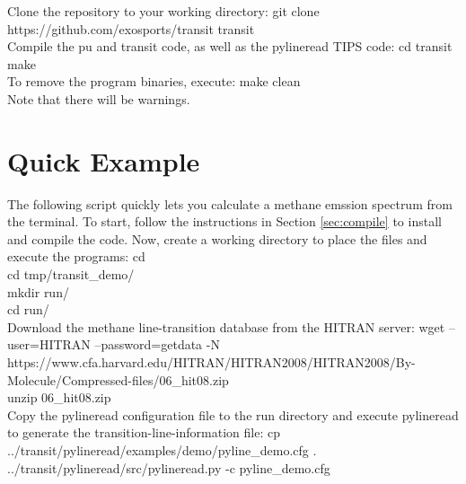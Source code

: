 \documentclass[letterpaper, 12pt]{article}
\begin{document}
\noindent Clone the repository to your working directory: \newline
{\tttb git clone https://github.com/exosports/transit transit} \\

\noindent Compile the {\tttm pu} and {\tttm transit} code, as well as
the {\tttm pylineread} TIPS code: \newline
{\tttb cd transit} \\
{\tttb make} \\

\noindent To remove the program binaries, execute: \newline
{\tttb make clean} \\

\noindent Note that there will be warnings.

\newpage

\section{Quick Example}
\label{sec:quick-example}

The following script quickly lets you calculate a methane emssion
spectrum from the terminal.  To start, follow the instructions in
Section \ref{sec:compile} to install and compile the code.  Now,
create a working directory to place the files and execute the
programs: \newline
{\tttb cd} \\
{\tttb cd tmp/transit\_demo/} \\
{\tttb mkdir run/} \\
{\tttb cd run/} \\

\noindent Download the methane line-transition database from the HITRAN
server: \newline
{\tttb 
wget --user=HITRAN --password=getdata -N https://www.cfa.harvard.edu/HITRAN/HITRAN2008/HITRAN2008/By-Molecule/Compressed-files/06\_hit08.zip} \\
{\tttb unzip 06\_hit08.zip} \\

\noindent Copy the {\tttm pylineread} configuration file to the run directory and execute pylineread to generate the transition-line-information file: \newline
{\tttb cp ../transit/pylineread/examples/demo/pyline\_demo.cfg .} \\
{\tttb ../transit/pylineread/src/pylineread.py -c pyline\_demo.cfg} \\
\end{document}
